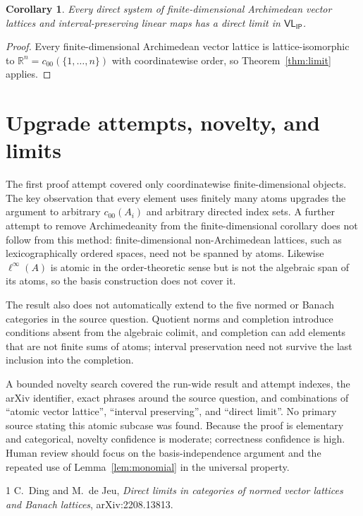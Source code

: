 \documentclass[11pt,a4paper]{article}
\newtheorem{corollary}[theorem]{Corollary}
\newcommand{\R}{\mathbb{R}}
\newcommand{\VLIP}{\mathsf{VL}_{\mathsf{IP}}}
\begin{document}
\begin{corollary}
Every direct system of finite-dimensional Archimedean vector lattices and
interval-preserving linear maps has a direct limit in $\VLIP$.
\end{corollary}

\begin{proof}
Every finite-dimensional Archimedean vector lattice is lattice-isomorphic to
$\R^n=c_{00}(\{1,\ldots,n\})$ with coordinatewise order, so
Theorem~\ref{thm:limit} applies.
\end{proof}

\section{Upgrade attempts, novelty, and limits}

The first proof attempt covered only coordinatewise finite-dimensional
objects.  The key observation that every element uses finitely many atoms
upgrades the argument to arbitrary $c_{00}(A_i)$ and arbitrary directed index
sets.  A further attempt to remove Archimedeanity from the finite-dimensional
corollary does not follow from this method: finite-dimensional
non-Archimedean lattices, such as lexicographically ordered spaces, need not be
spanned by atoms.  Likewise $\ell^\infty(A)$ is atomic in the order-theoretic
sense but is not the algebraic span of its atoms, so the basis construction
does not cover it.

The result also does not automatically extend to the five normed or Banach
categories in the source question.  Quotient norms and completion introduce
conditions absent from the algebraic colimit, and completion can add elements
that are not finite sums of atoms; interval preservation need not survive the
last inclusion into the completion.

A bounded novelty search covered the run-wide result and attempt indexes, the
arXiv identifier, exact phrases around the source question, and combinations
of ``atomic vector lattice'', ``interval preserving'', and ``direct limit''.
No primary source stating this atomic subcase was found.  Because the proof is
elementary and categorical, novelty confidence is moderate; correctness
confidence is high.  Human review should focus on the basis-independence
argument and the repeated use of Lemma~\ref{lem:monomial} in the universal
property.

\begin{thebibliography}{1}
C.~Ding and M.~de Jeu,
\emph{Direct limits in categories of normed vector lattices and Banach
lattices}, arXiv:2208.13813.
\end{thebibliography}
\end{document}
